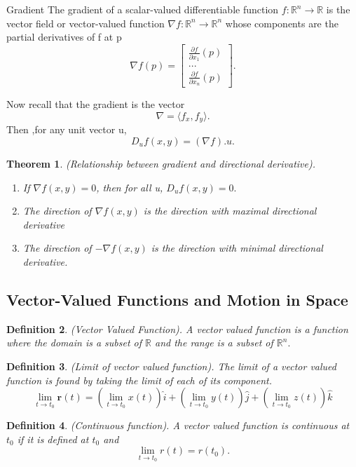 \documentclass[twoside]{article}
\newcounter{lecnum}
\newtheorem{theorem}{Theorem}[lecnum]
\newtheorem{definition}[theorem]{Definition}
\begin{document}
\begin{definition_exam}{Gradient}{} The gradient of a scalar-valued differentiable function $f: \mathbb{R}^n \rightarrow \mathbb{R}$ is the vector field or vector-valued function $\nabla f: \mathbb{R}^n \rightarrow \mathbb{R}^n$ whose components are the partial derivatives of f at p 
$$
\nabla f(p) = \begin{bmatrix}
\frac{\partial f}{\partial x_1}(p) \\
...\\
\frac{\partial f}{\partial x_n}(p) 
\end{bmatrix}.
$$
\end{definition_exam}

Now recall that the gradient is the vector 
$$
\nabla = \langle f_x, f_y \rangle.
$$
Then ,for any unit vector u, 
$$
D_uf(x,y) = (\nabla f).u.
$$

\begin{theorem}(Relationship between gradient and directional derivative). 
\begin{enumerate}
\item If $\nabla f(x,y) = 0$, then for all u, $D_uf(x,y) = 0.$
\item The direction of $\nabla f(x,y)$ is the direction with maximal directional derivative
\item The direction of $-\nabla f(x,y)$ is the direction with minimal directional derivative.
\end{enumerate}
\end{theorem}

\subsection{Vector-Valued Functions and Motion in Space}
\begin{definition}(Vector Valued Function). A vector valued function is a function where the domain is a subset of $\mathbb{R}$ and the range is a subset of $\mathbb{R}^n.$
\end{definition}

\begin{definition}(Limit of vector valued function). The limit of a vector valued function is found by taking the limit of each of its component.
$$
\lim_{t \rightarrow t_0}\textbf{r}(t) = (\lim_{t \rightarrow t_0}x(t))\hat{i} + (\lim_{t \rightarrow t_0}y(t))\hat{j} + (\lim_{t \rightarrow t_0}z(t))\hat{k}
$$
\end{definition}

\begin{definition}(Continuous function). A vector valued function is continuous at $t_0$ if it is defined at $t_0$ and 
$$
\lim_{t \rightarrow t_0}r(t) = r(t_0).
$$
\end{definition}
\end{document}
